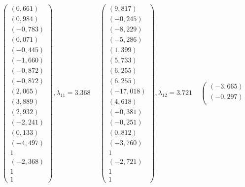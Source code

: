 \documentclass[a5paper, 10pt]{article}
\theoremstyle{definition}
\theoremstyle{plain}
\theoremstyle{remark}
\begin{document}
\begin{equation*}
\left(\begin{matrix}
\left(0,661\right) \\
\left(0,984\right) \\
\left(-0,783\right) \\
\left(0,071\right) \\
\left(-0,445\right) \\
\left(-1,660\right) \\
\left(-0,872\right) \\
\left(-0,872\right) \\
\left(2,065\right) \\
\left(3,889\right) \\
\left(2,932\right) \\
\left(-2,241\right) \\
\left(0,133\right) \\
\left(-4,497\right) \\
1 \\
\left(-2,368\right) \\
1 \\
1
\end{matrix}\right)
,  \lambda_ {11} =3.368\,\,\,\,\,\,\,\,
\left(\begin{matrix}
\left(9,817\right) \\
\left(-0,245\right) \\
\left(-8,229\right) \\
\left(-5,286\right) \\
\left(1,399\right) \\
\left(5,733\right) \\
\left(6,255\right) \\
\left(6,255\right) \\
\left(-17,018\right) \\
\left(4,618\right) \\
\left(-0,381\right) \\
\left(-0,251\right) \\
\left(0,812\right) \\
\left(-3,760\right) \\
1 \\
\left(-2,721\right) \\
1 \\
1
\end{matrix}\right)
,  \lambda_ {12} =3.721\,\,\,\,\,\,\,
\left(\begin{matrix}
\left(-3,665\right) \\
\left(-0,297\right) \\

\end{matrix}
\end{equation*}
\end{document}
